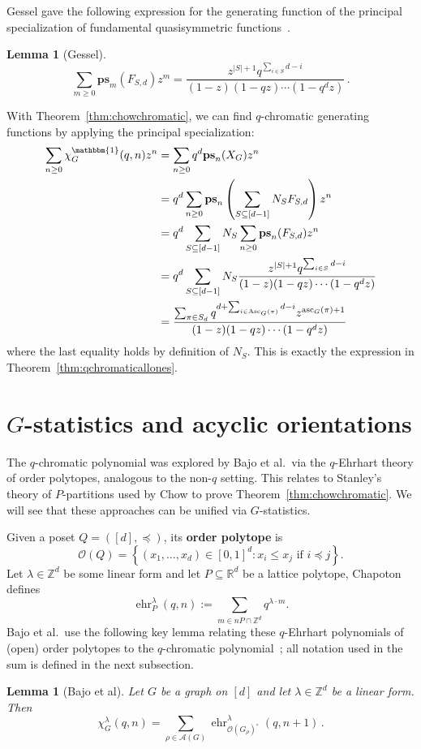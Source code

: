 \documentclass[11pt]{amsart}
\newtheorem{lemma}[theorem]{Lemma}
\newcommand\Def[1]{{\bf #1}}
\newcommand\ehr{\operatorname{ehr}}
\newcommand{\asc}{\mathrm{Asc}}
\newcommand{\ascnum}{\mathrm{asc}}
\newcommand{\order}[1]{\mathcal{O}(#1)}
\newcommand{\acyclic}[1]{\mathcal{A}(#1)}
\newcommand{\ps}{\textbf{ps}}
\begin{document}
Gessel gave the following expression for the generating function of the principal specialization of fundamental
quasisymmetric functions~\cite[Lemma 5.2]{gesseldescent}.
\begin{lemma}[Gessel]
    \[
        \sum_{m \geq 0} \ps_m(F_{S,d}) z^m =  \frac{z^{|S|+1} q^{\sum_{i \in S} d-i} }{(1-z)(1-qz) \cdots
(1-q^dz)} \, .
    \]
\end{lemma}

With Theorem~\ref{thm:chowchromatic}, we can find $q$-chromatic generating functions by applying the principal specialization:
\begin{align*}
    \sum_{n \geq 0} \chi_G^\mathbbm{1}(q,n) z^n &= \sum_{n \geq 0} q^d \ps_n(X_G) z^n \\
    &= q^d \sum_{n \geq 0} \ps_n \left( \sum_{S \subseteq [d-1]} N_S F_{S,d}\right) z^n \\
    &= q^d \sum_{S \subseteq [d-1]} N_S \sum_{n \geq 0} \ps_n(F_{S,d}) z^n \\
    &=  q^d \sum_{S \subseteq [d-1]} N_S \frac{z^{|S|+1} q^{\sum_{i \in S} d-i} }{(1-z)(1-qz) \cdots (1-q^dz)} \\
    &= \frac{\sum_{\pi \in S_d} q^{d+\sum_{i \in \asc_G(\pi)} d-i} z^{\ascnum_G(\pi)+1}}{(1-z)(1-qz) \cdots (1-q^dz)}
\end{align*}
where the last equality holds by definition of $N_S$. 
This is exactly the expression in Theorem~\ref{thm:qchromaticallones}.



\section{$G$-statistics and acyclic orientations}\label{sec:gstatsandorientations}

The $q$-chromatic polynomial was explored by Bajo et al.\ via the $q$-Ehrhart theory of order polytopes,
analogous to the non-$q$ setting.
This relates to Stanley's theory of $P$-partitions used by Chow to prove Theorem~\ref{thm:chowchromatic}.
We will see that these approaches can be unified via $G$-statistics.

Given a poset $Q = ([d],\preceq)$, its \Def{order polytope} is
\[
    \order{Q} = \left\{(x_1,\ldots,x_d) \in [0,1]^d : x_i \leq x_j \text{ if } i \preceq j \right\}.
\]
Let $\lambda \in \mathbb{Z}^d$ be some linear form and let $P \subseteq \mathbb{R}^d$ be a lattice polytope,
Chapoton~\cite{chapoton} defines
\[
    \ehr_P^\lambda(q,n) := \sum_{m \in nP \cap \mathbb{Z}^d} q^{\lambda \cdot m}.
\]
Bajo et al.\ use the following key lemma relating these $q$-Ehrhart polynomials of (open) order polytopes to the
$q$-chromatic polynomial~\cite[Lemma~3]{qchromatic}; all notation used in the sum is defined in the next subsection.
\begin{lemma}[Bajo et al]\label{lem:qchromaticqehrhart}
    Let $G$ be a graph on $[d]$ and let $\lambda \in \mathbb{Z}^d$ be a linear form. Then 
    \[
        \chi^\lambda_G(q,n) = \sum_{\rho \in \acyclic{G}} \ehr^\lambda_{\order{G_\rho}^\circ}(q,n+1) \, .
    \]
\end{lemma}
\end{document}
